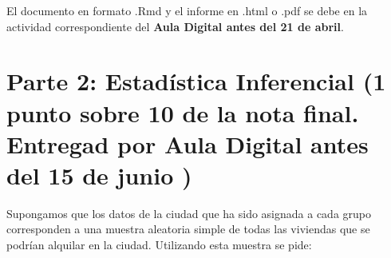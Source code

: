 \documentclass[
]{article}
\begin{document}
El documento en formato .Rmd y el informe en .html o .pdf se debe en la
actividad correspondiente del \textbf{Aula Digital antes del 21 de
abril}.

\hypertarget{parte-2-estaduxedstica-inferencial-1-punto-sobre-10-de-la-nota-final.-entregad-por-aula-digital-antes-del-15-de-junio}{%
\section{Parte 2: Estadística Inferencial (1 punto sobre 10 de la nota
final. Entregad por Aula Digital antes del 15 de junio
)}\label{parte-2-estaduxedstica-inferencial-1-punto-sobre-10-de-la-nota-final.-entregad-por-aula-digital-antes-del-15-de-junio}}

Supongamos que los datos de la ciudad que ha sido asignada a cada grupo
corresponden a una muestra aleatoria simple de todas las viviendas que
se podrían alquilar en la ciudad. Utilizando esta muestra se pide:
\end{document}
